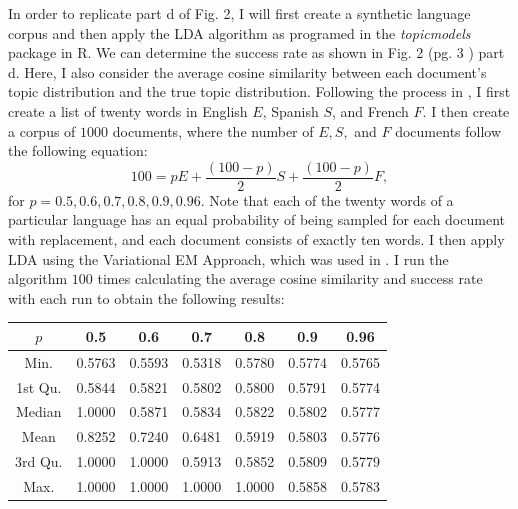 \documentclass[12pt]{article}
\begin{document}
\noindent In order to replicate part d of Fig. 2, I will first create a synthetic language corpus and then apply the LDA algorithm as programed in the \textit{topicmodels} package in R. We can determine the success rate as shown in Fig. 2 (pg. 3 \cite{main}) part d. Here, I also consider the average cosine similarity between each document's topic distribution and the true topic distribution. Following the process in \cite{main}, I first create a list of twenty words in English $E$, Spanish $S$, and French $F$. I then create a corpus of $1000$ documents, where the number of $E, S,$ and $F$ documents follow the following equation:
$$
100=pE+\frac{(100-p)}{2}S+\frac{(100-p)}{2}F,
$$ 
for $p=0.5, 0.6, 0.7, 0.8, 0.9, 0.96$. Note that each of the twenty words of a particular language has an equal probability of being sampled for each document with replacement, and each document consists of exactly ten words. I then apply LDA using the Variational EM Approach, which was used in \cite{main}. I run the algorithm $100$ times calculating the average cosine similarity and success rate with each run to obtain the following results:   
\vspace{2mm}
\begin{center}
	\begin{tabular}{ ||c|c|c|c|c|c|c||  }
		\hline
		$p$ &0.5&0.6&0.7&0.8&0.9&0.96 \\ 
		\hline 
		Min.    &0.5763 &0.5593 &0.5318 &0.5780 &0.5774 &0.5765\\
		1st Qu. &0.5844 &0.5821 &0.5802 &0.5800 &0.5791 &0.5774\\
		Median  &1.0000 &0.5871 &0.5834 &0.5822 &0.5802 &0.5777\\
		Mean    &0.8252 &0.7240 &0.6481 &0.5919 &0.5803 &0.5776\\
		3rd Qu. &1.0000 &1.0000 &0.5913 &0.5852 &0.5809 &0.5779\\
		Max.    &1.0000 &1.0000 &1.0000 &1.0000 &0.5858 &0.5783\\
		\hline
	\end{tabular}
\end{center}
\vspace{2mm}
\end{document}
